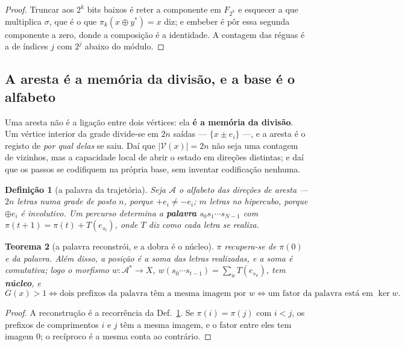 \documentclass[11pt,a4paper]{article}
\newtheorem{teorema}{Teorema}
\newtheorem{definicao}[teorema]{Definição}
\begin{document}
\begin{proof}
Truncar aos $2^{k}$ bits baixos é reter a componente em $F_{2^{k}}$ e esquecer a
que multiplica $\sigma$, que é o que $\pi_k(x\oplus y^{*})=x$ diz; e embeber é
pôr essa segunda componente a zero, donde a composição é a identidade. A
contagem das réguas é a de índices $j$ com $2^{j}$ abaixo do módulo.
\end{proof}

\subsection*{A aresta é a memória da divisão, e a base é o alfabeto}

\noindent Uma aresta não é a ligação entre dois vértices: ela \textbf{é a
memória da divisão}. Um vértice interior da grade divide-se em $2n$ saídas ---
$\{x\pm e_i\}$ ---, e a aresta é o registo de \emph{por qual delas} se saiu. Daí
que $\lvert \mathcal{V}(x)\rvert=2n$ não seja uma contagem de vizinhos, mas a capacidade
local de abrir o estado em direções distintas; e daí que os passos se codifiquem
na própria base, sem inventar codificação nenhuma.

\begin{definicao}[a palavra da trajetória]\label{def:palavra}
Seja $\mathcal{A}$ o alfabeto das direções de aresta --- $2n$ letras numa
grade de posto $n$, porque $+e_i\neq-e_i$; $m$ letras no hipercubo, porque $\oplus e_i$ é
involutivo. Um percurso determina a \textbf{palavra} $s_0s_1\cdots s_{N-1}$ com
$\pi(t+1)=\pi(t)+T(e_{s_t})$, onde $T$ diz como cada letra se realiza.
\end{definicao}

\begin{teorema}[a palavra reconstrói, e a dobra é o núcleo]\label{thm:palavra}
$\pi$ recupera-se de $\pi(0)$ e da palavra. Além disso, a posição é a
\emph{soma} das letras realizadas, e a soma é comutativa; logo o morfismo
$w\colon\mathcal{A}^{*}\to X$, $w(s_0\cdots s_{t-1})=\sum_u T(e_{s_u})$, tem
\textbf{núcleo}, e
\[
G(x)>1
\iff
\text{dois prefixos da palavra têm a mesma imagem por }w
\iff
\text{um fator da palavra está em }\ker w .
\]
\end{teorema}

\begin{proof}
A reconstrução é a recorrência da Def.~\ref{def:palavra}. Se $\pi(i)=\pi(j)$
com $i<j$, os prefixos de comprimentos $i$ e $j$ têm a mesma imagem, e o fator
entre eles tem imagem $0$; o recíproco é a mesma conta ao contrário.
\end{proof}
\end{document}
